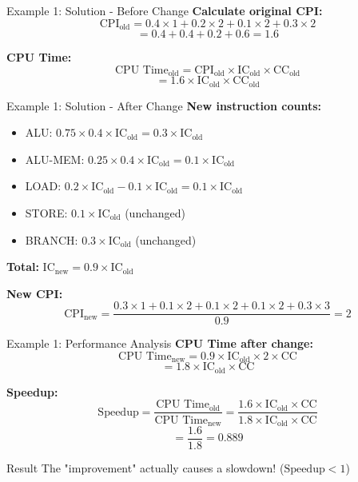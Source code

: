 \documentclass[aspectratio=169,12pt]{beamer}
\begin{document}
\begin{frame}{Example 1: Solution - Before Change}
\textbf{Calculate original CPI:}
$$\text{CPI}_\text{old} = 0.4 \times 1 + 0.2 \times 2 + 0.1 \times 2 + 0.3 \times 2$$
$$= 0.4 + 0.4 + 0.2 + 0.6 = 1.6$$

\vspace{1em}
\textbf{CPU Time:}
$$\text{CPU Time}_\text{old} = \text{CPI}_\text{old} \times \text{IC}_\text{old} \times \text{CC}_\text{old}$$
$$= 1.6 \times \text{IC}_\text{old} \times \text{CC}_\text{old}$$
\end{frame}

\begin{frame}{Example 1: Solution - After Change}
\textbf{New instruction counts:}
\begin{itemize}
    \item ALU: $0.75 \times 0.4 \times \text{IC}_\text{old} = 0.3 \times \text{IC}_\text{old}$
    \item ALU-MEM: $0.25 \times 0.4 \times \text{IC}_\text{old} = 0.1 \times \text{IC}_\text{old}$
    \item LOAD: $0.2 \times \text{IC}_\text{old} - 0.1 \times \text{IC}_\text{old} = 0.1 \times \text{IC}_\text{old}$
    \item STORE: $0.1 \times \text{IC}_\text{old}$ (unchanged)
    \item BRANCH: $0.3 \times \text{IC}_\text{old}$ (unchanged)
\end{itemize}

\textbf{Total:} $\text{IC}_\text{new} = 0.9 \times \text{IC}_\text{old}$

\textbf{New CPI:} 
$$\text{CPI}_\text{new} = \frac{0.3 \times 1 + 0.1 \times 2 + 0.1 \times 2 + 0.1 \times 2 + 0.3 \times 3}{0.9} = 2$$
\end{frame}

\begin{frame}{Example 1: Performance Analysis}
\textbf{CPU Time after change:}
$$\text{CPU Time}_\text{new} = 0.9 \times \text{IC}_\text{old} \times 2 \times \text{CC}$$
$$= 1.8 \times \text{IC}_\text{old} \times \text{CC}$$

\vspace{1em}
\textbf{Speedup:}
$$\text{Speedup} = \frac{\text{CPU Time}_\text{old}}{\text{CPU Time}_\text{new}} = \frac{1.6 \times \text{IC}_\text{old} \times \text{CC}}{1.8 \times \text{IC}_\text{old} \times \text{CC}}$$
$$= \frac{1.6}{1.8} = 0.889$$

\begin{alertblock}{Result}
The "improvement" actually causes a slowdown! ($\text{Speedup} < 1$)
\end{alertblock}
\end{frame}
\end{document}
